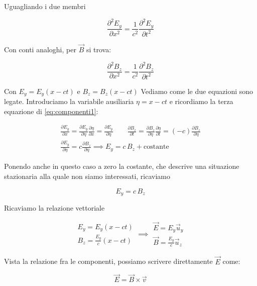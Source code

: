 Uguagliando i due membri

\[
	\boxed{\frac{\partial^2 E_y}{\partial x^2} = \frac{1}{c^2} \frac{\partial^2 E_y}{\partial t^2}}
\]

Con conti analoghi, per $ \vec{B}$ si trova:

\[
	\boxed{\frac{\partial^2 B_z}{\partial x^2} = \frac{1}{c^2} \frac{\partial^2 B_z}{\partial t^2}}
\]

Con $ E_y = E_y(x-ct) $ e $ B_z  = B_z (x-ct) $
Vediamo come le due equazioni sono legate. Introduciamo la variabile ausiliaria $ \eta = x-ct $ e ricordiamo la terza equazione di \eqref{eq:componenti1}:

\begin{gather*}
	\frac{\partial E_y}{\partial x} = \frac{\partial E_y}{\partial \eta} \frac{\partial \eta}{\partial x} = \frac{\partial E_y}{\partial \eta} \qquad \frac{\partial B_z}{\partial t} = \frac{\partial B_z}{\partial \eta} \frac{\partial \eta}{\partial t} = (-c) \frac{\partial B_z}{\partial \eta} \\
	\frac{\partial E_y}{\partial \eta} = c \frac{\partial B_z}{\partial \eta} \implies E_y = c\,B_z + \text{costante}
\end{gather*}

Ponendo anche in questo caso a zero la costante, che descrive una situazione stazionaria alla quale non siamo interessati, ricaviamo

\[
	\boxed{E_y = c\,B_z}
\]

Ricaviamo la relazione vettoriale

\[
	\left. \begin{array}{r}
	 	E_y = E_y(x-ct) \\
		B_z = \frac{E_y}{c}(x-ct)
	\end{array} \right. \implies
	\left. \begin{array}{l}
	 	\vec{E} = E_y\vec{u}_y  \\
		\vec{B} = \frac{E_y}{c} \vec{u}_z
	\end{array} \right.
\]

Vista la relazione fra le componenti, possiamo scrivere direttamente $\vec{E}$ come:

\[
	\boxed{\vec{E} = \vec{B} \times \vec{v}}
\]

